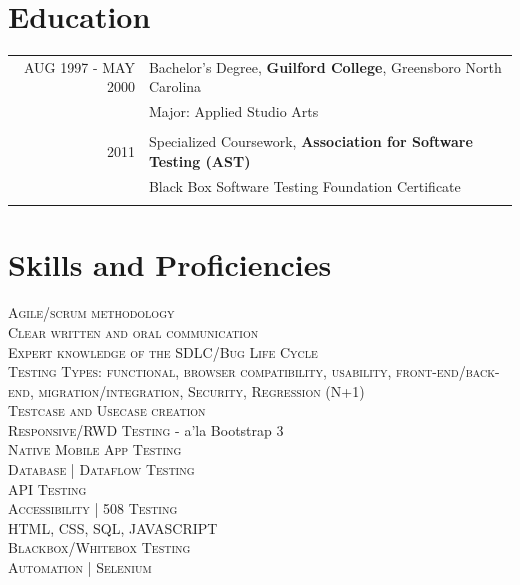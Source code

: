 \documentclass[a4paper,10pt]{article}
\begin{document}
\section{Education}
\begin{tabular}{rl}
\textsc{AUG 1997 - MAY 2000}  & Bachelor's Degree, \textbf{Guilford College}, Greensboro North Carolina\\
& Major: Applied Studio Arts\\&\\
\textsc2011& Specialized Coursework, \textbf{Association for Software Testing (AST)}\\
&\normalsize Black Box Software Testing Foundation Certificate\\&\\
\end{tabular}
\section{Skills and Proficiencies}
\begin{flushleft}
\textsc{Agile/scrum methodology}\\ \textsc{Clear written and oral communication}\\ \textsc{Expert knowledge of the SDLC/Bug Life Cycle}\\ \textsc{Testing Types: functional, browser compatibility, usability, front-end/back-end, migration/integration, Security, Regression (N+1)}\\ \textsc{Testcase and Usecase creation}\\ \textsc{Responsive/RWD Testing} - a'la {Bootstrap 3}\\ \textsc{Native Mobile App Testing}\\ \textsc{Database | Dataflow Testing}\\ \textsc{API Testing}\\ \textsc{Accessibility | 508 Testing}\\  \textsc{HTML, CSS, SQL, JAVASCRIPT}\\\textsc{Blackbox/Whitebox Testing}\\ \textsc{Automation | Selenium}\\ 
\end{flushleft}


\vspace{115 mm}
\begin{center}
\end{center}
\end{document}
